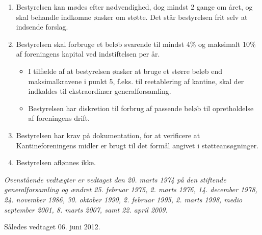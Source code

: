 \documentclass[a4paper, 10pt]{article}
\begin{document}
\begin{enumerate}
\item Bestyrelsen kan mødes efter nødvendighed, dog mindst 2 gange om
året, og skal behandle indkomne ønsker om støtte. Det står bestyrelsen
frit selv at indsende forslag.

\item Bestyrelsen skal forbruge et beløb svarende til mindst 4\% og
maksimalt 10\% af foreningens kapital ved indstiftelsen per år.

\begin{itemize}

\item I tilfælde af at bestyrelsen ønsker at bruge et større beløb end
maksimalkravene i punkt 5, f.eks. til reetablering af kantine, skal
der indkaldes til ekstraordinær generalforsamling.

\item Bestyrelsen har diskretion til forbrug af passende beløb til
opret\-holdelse af foreningens drift.

\end{itemize}

\item Bestyrelsen har krav på dokumentation, for at verificere at
Kantinefor\-eningens midler er brugt til det formål angivet i
støtteansøgninger.

\item Bestyrelsen aflønnes ikke.

\end{enumerate}

\vspace{\fill}

\noindent \emph{Ovenstående vedtægter er vedtaget den 20. marts 1974
på den stiftende generalforsamling og ændret 25.  februar 1975, 2.
marts 1976, 14. december 1978, 24. november 1986, 30.  oktober 1990,
2.  februar 1995, 2. marts 1998, medio september 2001, 8. marts 2007,
samt 22. april 2009.}

\bigskip

\noindent Således vedtaget 06. juni 2012.
\end{document}
